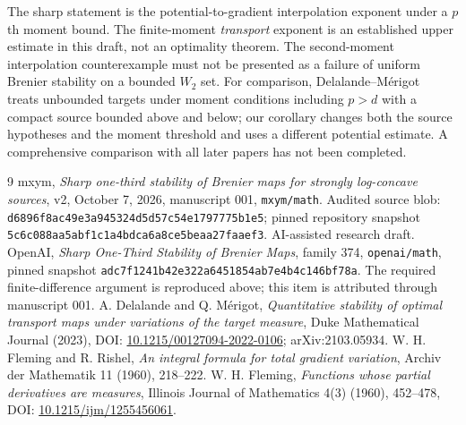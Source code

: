 \documentclass[11pt]{article}
\theoremstyle{remark}\newtheorem{remark}[theorem]{Remark}
\begin{document}
The sharp statement is the potential-to-gradient interpolation exponent under a $p$th moment bound. The finite-moment \emph{transport} exponent is an established upper estimate in this draft, not an optimality theorem. The second-moment interpolation counterexample must not be presented as a failure of uniform Brenier stability on a bounded $W_2$ set. For comparison, Delalande--M\'erigot~\cite{DM} treats unbounded targets under moment conditions including $p>d$ with a compact source bounded above and below; our corollary changes both the source hypotheses and the moment threshold and uses a different potential estimate. A comprehensive comparison with all later papers has not been completed.

\clearpage
\begin{thebibliography}{9}
 mxym, \emph{Sharp one-third stability of Brenier maps for strongly log-concave sources}, v2, October 7, 2026, manuscript 001, \texttt{mxym/math}. Audited source blob: \texttt{d6896f8ac49e3a945324d5d57c54e1797775b1e5}; pinned repository snapshot \texttt{5c6c088aa5abf1c1a4bdca6a8ce5beaa27faaef3}. AI-assisted research draft.
 OpenAI, \emph{Sharp One-Third Stability of Brenier Maps}, family 374, \texttt{openai/math}, pinned snapshot \texttt{adc7f1241b42e322a6451854ab7e4b4c146bf78a}. The required finite-difference argument is reproduced above; this item is attributed through manuscript 001.
 A. Delalande and Q. M\'erigot, \emph{Quantitative stability of optimal transport maps under variations of the target measure}, Duke Mathematical Journal (2023), DOI: \href{https://doi.org/10.1215/00127094-2022-0106}{10.1215/00127094-2022-0106}; arXiv:2103.05934.
 W. H. Fleming and R. Rishel, \emph{An integral formula for total gradient variation}, Archiv der Mathematik 11 (1960), 218--222.
 W. H. Fleming, \emph{Functions whose partial derivatives are measures}, Illinois Journal of Mathematics 4(3) (1960), 452--478, DOI: \href{https://doi.org/10.1215/ijm/1255456061}{10.1215/ijm/1255456061}.
\end{thebibliography}
\end{document}
